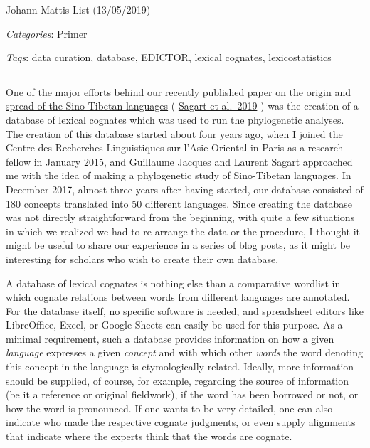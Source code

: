 \documentclass[
  a4paper,
  14pt,
  oneside,
  tablecaptionabove
]{scrbook}
\begin{document}
Johann-Mattis List (13/05/2019)

\emph{Categories}: Primer

\emph{Tags}: data curation, database, EDICTOR, lexical cognates,
lexicostatistics

\begin{center}\rule{0.5\linewidth}{1pt}\end{center}


One of the major efforts behind our recently published paper on the
\href{https://www.pnas.org/content/early/2019/04/30/1817972116}{origin
and spread of the Sino-Tibetan languages} (
\href{http://bibliography.lingpy.org?key=Sagart2019}{Sagart et al.~2019}
) was the creation of a database of lexical cognates which was used to
run the phylogenetic analyses. The creation of this database started
about four years ago, when I joined the Centre des Recherches
Linguistiques sur l'Asie Oriental in Paris as a research fellow in
January 2015, and Guillaume Jacques and Laurent Sagart approached me
with the idea of making a phylogenetic study of Sino-Tibetan languages.
In December 2017, almost three years after having started, our database
consisted of 180 concepts translated into 50 different languages. Since
creating the database was not directly straightforward from the
beginning, with quite a few situations in which we realized we had to
re-arrange the data or the procedure, I thought it might be useful to
share our experience in a series of blog posts, as it might be
interesting for scholars who wish to create their own database.

A database of lexical cognates is nothing else than a comparative
wordlist in which cognate relations between words from different
languages are annotated. For the database itself, no specific software
is needed, and spreadsheet editors like LibreOffice, Excel, or Google
Sheets can easily be used for this purpose. As a minimal requirement,
such a database provides information on how a given \emph{language}
expresses a given \emph{concept} and with which other \emph{words} the
word denoting this concept in the language is etymologically related.
Ideally, more information should be supplied, of course, for example,
regarding the source of information (be it a reference or original
fieldwork), if the word has been borrowed or not, or how the word is
pronounced. If one wants to be very detailed, one can also indicate who
made the respective cognate judgments, or even supply alignments that
indicate where the experts think that the words are cognate.
\end{document}
